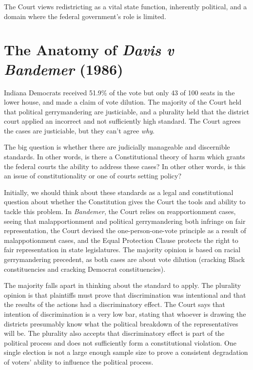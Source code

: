 The Court views redistricting as a vital state function, inherently political, and a domain where the federal government's role is limited.  

\section*{The Anatomy of \textit{Davis v Bandemer} (1986)}

Indiana Democrats received 51.9\% of the vote but only 43 of 100 seats in the lower house, and made a claim of vote dilution.  The majority of the Court held that political gerrymandering are justiciable, and a plurality held that the district court applied an incorrect and not sufficiently high standard.  The Court agrees the cases are justiciable, but they can't agree \textit{why}.

The big question is whether there are judicially manageable and discernible standards.  In other words, is there a Constitutional theory of harm which grants the federal courts the ability to address these cases?  In other other words, is this an issue of constitutionality or one of courts setting policy?

Initially, we should think about these standards as a legal and constitutional question about whether the Constitution gives the Court the tools and ability to tackle this problem.  In \textit{Bandemer}, the Court relies on reapportionment cases, seeing that malapportionment and political gerrymandering both infringe on fair representation, the Court devised the one-person-one-vote principle as a result of malappotionment cases, and the Equal Protection Clause protects the right to fair representation in state legislatures.  The majority opinion is based on racial gerrymandering precedent, as both cases are about vote dilution (cracking Black constituencies and cracking Democrat constituencies).

The majority falls apart in thinking about the standard to apply.  The plurality opinion is that plaintiffs must prove that discrimination was intentional and that the results of the actions had a discriminatory effect.  The Court says that intention of discrimination is a very low bar, stating that whoever is drawing the districts presumably know what the political breakdown of the representatives will be.  The plurality also accepts that discriminatory effect is part of the political process and does not sufficiently form a constitutional violation.  One single election is not a large enough sample size to prove a consistent degradation of voters' ability to influence the political process.

